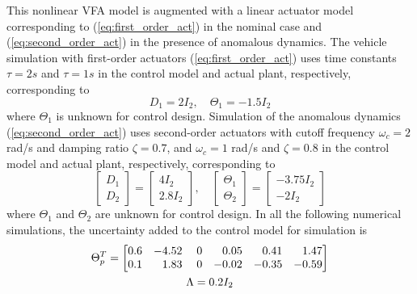 \documentclass[english]{ifacconf}
\begin{document}
This nonlinear VFA model is augmented with a linear actuator model corresponding to (\ref{eq:first_order_act}) in the nominal case and (\ref{eq:second_order_act}) in the presence of anomalous dynamics. The vehicle simulation with first-order actuators (\ref{eq:first_order_act}) uses time constants $\tau = 2 s$ and $\tau = 1 s$ in the control model and actual plant, respectively, corresponding to
\begin{equation}
D_1 = 2 I_2, \quad \Theta_1 = -1.5 I_2
\end{equation}
where $\Theta_1$ is unknown for control design. Simulation of the anomalous dynamics (\ref{eq:second_order_act}) uses second-order actuators with cutoff frequency $\omega_c = 2$ rad/s and damping ratio $\zeta = 0.7$, and $\omega_c = 1$ rad/s and $\zeta = 0.8$ in the control model and actual plant, respectively, corresponding to
\begin{equation}
\begin{bmatrix}
	D_1 \\ D_2
\end{bmatrix} = \begin{bmatrix}
	4 I_2 \\ 2.8 I_2
\end{bmatrix}, \quad \begin{bmatrix}
	\Theta_1 \\ \Theta_2 
\end{bmatrix} = \begin{bmatrix}
	-3.75 I_2 \\ -2 I_2
\end{bmatrix}
\end{equation}
where $\Theta_1$ and $\Theta_2$ are unknown for control design. In all the following numerical simulations, the uncertainty added to the control model for simulation is
\begin{equation}
\begin{gathered}
\Theta_{p}^{T}=\begin{bmatrix}
0.6 & -4.52 & \; 0 & \hfill 0.05 & \hfill 0.41 & \hfill 1.47\\
0.1 & \hfill 1.83 & \; 0 & -0.02 & -0.35 & -0.59
\end{bmatrix}\\ \Lambda = 0.2 I_2 \end{gathered}
\end{equation}
\end{document}
